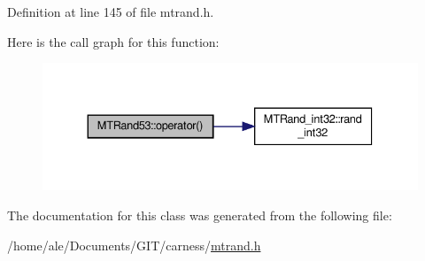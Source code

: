 Definition at line 145 of file mtrand.\-h.



Here is the call graph for this function\-:\nopagebreak
\begin{figure}[H]
\begin{center}
\leavevmode
\includegraphics[width=330pt]{a00011_ab6657cb5349f39bc4553d3a970458b45_cgraph}
\end{center}
\end{figure}




The documentation for this class was generated from the following file\-:\begin{DoxyCompactItemize}
\item 
/home/ale/\-Documents/\-G\-I\-T/carness/\hyperlink{a00085}{mtrand.\-h}\end{DoxyCompactItemize}
